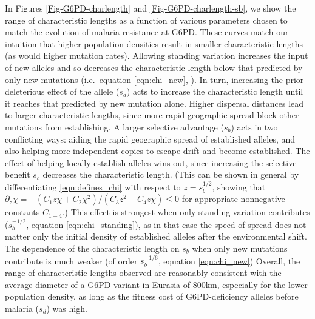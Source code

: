 \documentclass{article}
\begin{document}
In Figures \ref{Fig-G6PD-charlength} and \ref{Fig-G6PD-charlength-sb}, we show the range of characteristic lengths as a function 
of various parameters chosen to match the evolution of malaria
resistance at G6PD. 
These curves match our intuition that higher population densities result in
smaller characteristic lengths (as would higher mutation rates). 
Allowing standing variation increases the 
input of new alleles and so decreases the characteristic length below that predicted
by only new mutations (i.e.\ equation \eqref{eqn:chi_new}, \citet{ralphcoop2010}).
In turn, increasing the prior deleterious effect of the allele ($s_d$)
acts to increase the
characteristic length until it reaches that predicted by new mutation alone. 
Higher dispersal distances lead to larger characteristic lengths, 
since more rapid geographic spread block other mutations from establishing. 
A larger selective advantage ($s_b$) acts in two conflicting
ways: aiding the rapid geographic spread of established alleles, and also helping more independent copies
to escape drift and become established. 
The effect of helping locally establish alleles wins out, since increasing the selective benefit $s_b$ decreases the characteristic length. 
 (This can be shown in general by differentiating \eqref{eqn:defines_chi} with respect to $z=s_b^{1/2}$,
showing that $\partial_{z} \chi = - ( C_1 z \chi + C_2 \chi^2 )/(C_3 z^2 + C_4 z \chi ) \le 0$ for appropriate nonnegative constants $C_{1-4}$.) 
This effect is strongest when only standing variation contributes ($s_b^{-1/2}$, equation \eqref{eqn:chi_standing}), 
as in that case the speed of spread does not matter only the
  initial density of established alleles after the environmental shift. 
The dependence of the characteristic length on $s_b$ when only new
mutations contribute is much weaker (of order $s_b^{-1/6}$, equation \eqref{eqn:chi_new})
Overall, the range of characteristic lengths observed are reasonably
consistent with the average diameter of a G6PD variant in Eurasia of
800km, especially for the lower population density, as long as the
fitness cost of G6PD-deficiency alleles before malaria ($s_d$) was high. 
\end{document}
